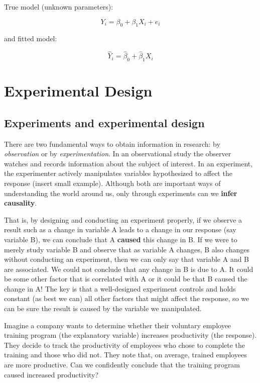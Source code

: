 \documentclass[
  letterpaper,
  DIV=11,
  numbers=noendperiod,
  oneside]{scrreprt}
\begin{document}
True model (unknown parameters):

\[
Y_i = \beta_0 + \beta_1 X_i + e_i
\]

and fitted model:

\[
\hat{Y}_i = \hat{\beta}_0 + \hat{\beta}_1 X_i
\]

\part{Experimental Design}

\chapter{Experiments and experimental
design}\label{experiments-and-experimental-design}

There are two fundamental ways to obtain information in research: by
\emph{observation} or by \emph{experimentation}. In an observational
study the observer watches and records information about the subject of
interest. In an experiment, the experimenter actively manipulates
variables hypothesized to affect the response (insert small example).
Although both are important ways of understanding the world around us,
only through experiments can we \textbf{infer causality}.

That is, by designing and conducting an experiment properly, if we
observe a result such as a change in variable A leads to a change in our
response (say variable B), we can conclude that A \textbf{caused} this
change in B. If we were to merely study variable B and observe that as
variable A changes, B also changes without conducting an experiment,
then we can only say that variable A and B are associated. We could not
conclude that any change in B is due to A. It could be some other factor
that is correlated with A or it could be that B caused the change in A!
The key is that a well-designed experiment controls and holds constant
(as best we can) all other factors that might affect the response, so we
can be sure the result is caused by the variable we manipulated.

Imagine a company wants to determine whether their voluntary employee
training program (the explanatory variable) increases productivity (the
response). They decide to track the productivity of employees who chose
to complete the training and those who did not. They note that, on
average, trained employees are more productive. Can we confidently
conclude that the training program caused increased productivity?
\end{document}
